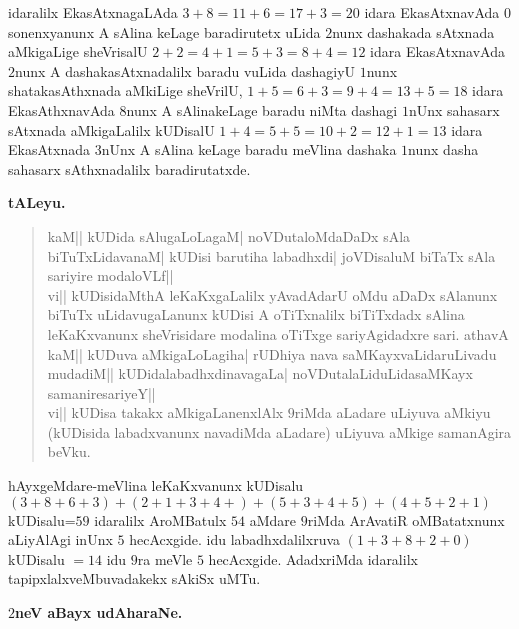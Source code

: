 idaralilx EkasAtxnagaLAda $3+8=11+6=17+3=20$ idara EkasAtxnavAda $0$ sonenxyanunx A sAlina keLage baradirutetx uLida $2$nunx dashakada sAtxnada aMkigaLige sheVrisalU $2+2=4+1=5+3=8+4=12$ idara EkasAtxnavAda $2$nunx A dashakasAtxnadalilx baradu vuLida dashagiyU $1$nunx shatakasAthxnada aMkiLige sheVrilU, $1+5=6+3=9+4=13+5=18$ idara EkasAthxnavAda $8$nunx A sAlinakeLage baradu niMta dashagi $1$nUnx sahasarx sAtxnada aMkigaLalilx kUDisalU $1+4=5+5=10+2=12+1=13$ idara EkasAtxnada $3$nUnx A sAlina keLage baradu meVlina dashaka $1$nunx dasha sahasarx sAthxnadalilx baradirutatxde.

\begin{center}
{\large\bf tALeyu.}
\end{center}

\begin{verse}
kaM|| kUDida sAlugaLoLagaM| noVDutaloMdaDaDx sAla biTuTxLidavanaM| kUDisi barutiha labadhxdi| joVDisaluM biTaTx sAla sariyire modaloVLf||\\

vi|| kUDisidaMthA leKaKxgaLalilx yAvadAdarU oMdu aDaDx sAlanunx biTuTx uLidavugaLanunx kUDisi A oTiTxnalilx biTiTxdadx sAlina leKaKxvanunx sheVrisidare modalina oTiTxge sariyAgidadxre sari. athavA\\

kaM|| kUDuva aMkigaLoLagiha| rUDhiya nava saMKayxvaLidaruLivadu mudadiM|| kUDidalabadhxdinavagaLa| noVDutalaLiduLidasaMKayx samaniresariyeY||\\

vi|| kUDisa takakx aMkigaLanenxlAlx $9$riMda aLadare uLiyuva aMkiyu (kUDisida labadxvanunx navadiMda aLadare) uLiyuva aMkige samanAgira beVku.
\end{verse}

hAyxgeMdare-meVlina leKaKxvanunx kUDisalu $(3+8+6+3)+ (2+1+3+4+)+ (5+3+4+5)+ (4+5+2+1)$ kUDisalu=$59$ idaralilx AroMBatulx $54$ aMdare $9$riMda ArAvatiR oMBatatxnunx aLiyAlAgi inUnx $5$ hecAcxgide. idu labadhxdalilxruva $(1+3+8+2+0)$ kUDisalu $=14$ idu $9$ra meVle $5$ hecAcxgide. AdadxriMda idaralilx tapipxlalxveMbuvadakekx sAkiSx uMTu.

\begin{center}
\bf{\large {$2$neV aBayx udAharaNe.}}
\end{center}


